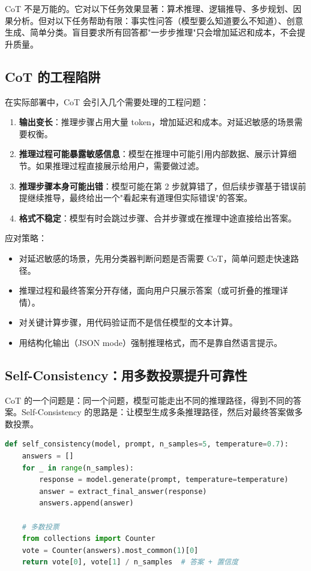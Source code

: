 \begin{note}
CoT 不是万能的。它对以下任务效果显著：算术推理、逻辑推导、多步规划、因果分析。但对以下任务帮助有限：事实性问答（模型要么知道要么不知道）、创意生成、简单分类。盲目要求所有回答都"一步步推理"只会增加延迟和成本，不会提升质量。
\end{note}

\subsection{CoT 的工程陷阱}
在实际部署中，CoT 会引入几个需要处理的工程问题：

\begin{enumerate}
  \item \textbf{输出变长}：推理步骤占用大量 token，增加延迟和成本。对延迟敏感的场景需要权衡。
  \item \textbf{推理过程可能暴露敏感信息}：模型在推理中可能引用内部数据、展示计算细节。如果推理过程直接展示给用户，需要做过滤。
  \item \textbf{推理步骤本身可能出错}：模型可能在第 2 步就算错了，但后续步骤基于错误前提继续推导，最终给出一个"看起来有道理但实际错误"的答案。
  \item \textbf{格式不稳定}：模型有时会跳过步骤、合并步骤或在推理中途直接给出答案。
\end{enumerate}

应对策略：

\begin{itemize}
  \item 对延迟敏感的场景，先用分类器判断问题是否需要 CoT，简单问题走快速路径。
  \item 推理过程和最终答案分开存储，面向用户只展示答案（或可折叠的推理详情）。
  \item 对关键计算步骤，用代码验证而不是信任模型的文本计算。
  \item 用结构化输出（JSON mode）强制推理格式，而不是靠自然语言提示。
\end{itemize}

\subsection{Self-Consistency：用多数投票提升可靠性}
CoT 的一个问题是：同一个问题，模型可能走出不同的推理路径，得到不同的答案。Self-Consistency 的思路是：让模型生成多条推理路径，然后对最终答案做多数投票。

\begin{lstlisting}[language=Python]
def self_consistency(model, prompt, n_samples=5, temperature=0.7):
    answers = []
    for _ in range(n_samples):
        response = model.generate(prompt, temperature=temperature)
        answer = extract_final_answer(response)
        answers.append(answer)

    # 多数投票
    from collections import Counter
    vote = Counter(answers).most_common(1)[0]
    return vote[0], vote[1] / n_samples  # 答案 + 置信度
\end{lstlisting}


